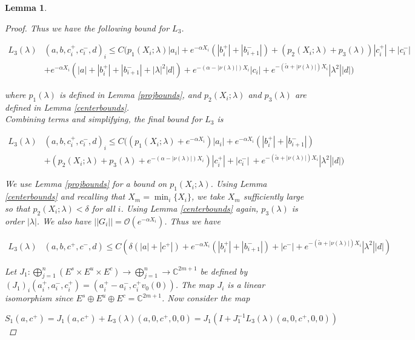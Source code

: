 \documentclass[12pt]{article}
\def\C{{\mathbb C}}
\newtheorem{lemma}{Lemma}
\begin{document}
\begin{lemma}
\begin{proof}
Thus we have the following bound for $L_3$.

\begin{align*}
L_3(\lambda)&(a, b, c_i^+, c_i^-, d)_i \leq C ( p_1(X_i; \lambda)|a_i|
+ e^{-\alpha X_i}(|b_i^+| + |b_{i+1}^-|) + (p_2(X_i; \lambda) + p_3(\lambda))|c_i^+| + |c_i^-| \\
&+ e^{-\alpha X_i}(|a| + |b_i^+| + |b_{i+1}^-| + |\lambda|^2 |d|) + e^{-(\alpha - |\nu(\lambda)|)X_i} |c_i| + e^{-(\tilde{\alpha}+|\nu(\lambda)|) X_i} |\lambda^2| |d| )
\end{align*}

where $p_1(\lambda)$ is defined in Lemma \ref{projbounds}, and $p_2(X_i; \lambda)$ and $p_3(\lambda)$ are defined in Lemma \ref{centerbounds}.\\

Combining terms and simplifying, the final bound for $L_3$ is

\begin{align*}
L_3(\lambda)&(a, b, c_i^+, c_i^-, d)_i \leq C ( (p_1(X_i; \lambda) + e^{-\alpha X_i})|a_i|
+ e^{-\alpha X_i} (|b_i^+| + |b_{i+1}^-|) \\
&+ (p_2(X_i; \lambda) + p_3(\lambda) + e^{-(\alpha - |\nu(\lambda)|)X_i})|c_i^+| + |c_i^-| \
+ e^{-(\tilde{\alpha}+|\nu(\lambda)|) X_i} |\lambda^2| |d| )
\end{align*}

We use Lemma \ref{projbounds} for a bound on $p_1(X_i; \lambda)$. Using Lemma \ref{centerbounds} and recalling that $X_m = \min_i \{ X_i \}$, we take $X_m$ sufficiently large so that $p_2(X_i; \lambda) < \delta$ for all $i$. Using Lemma \ref{centerbounds} again, $p_3(\lambda)$ is order $|\lambda|$. We also have $||G_i|| = \mathcal{O}(e^{-\alpha X_i})$. Thus we have

\begin{align*}
L_3(\lambda)&(a, b, c^+, c^-, d)\leq C (\delta (|a| + |c^+|) + e^{-\alpha X_i}(|b_i^+| + |b_{i+1}^-|) + |c^-| + e^{-(\tilde{\alpha}+|\nu(\lambda)|) X_i} |\lambda^2| |d|)
\end{align*}

Let $J_1: \bigoplus_{j=1}^n (E^s \times E^u \times E^c) \rightarrow \bigoplus_{j=1}^n \rightarrow \C^{2m+1}$ be defined by $(J_1)_i(a_i^+, a_i^-, c_i^+) = (a_i^+ - a_i^-, c_i^+ v_0(0) )$. The map $J_i$ is a linear isomorphism since $E^s \oplus E^u \oplus E^c = \C^{2m + 1}$. Now consider the map

\[
S_1(a, c^+) = J_1 (a, c^+) + L_3(\lambda)(a, 0, c^+, 0, 0) = J_1( I + J_1^{-1} L_3(\lambda)(a, 0, c^+, 0, 0))
\]


\end{proof}
\end{lemma}
\end{document}
